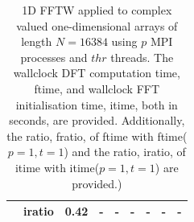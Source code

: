 \documentclass[a4paper]{article}
\begin{document}
\begin{table}[htbp]
\begin{center}
\begin{small}
\begin{tabular}{|r|r|r|r|r|r|r|r|r|}
     &  iratio &   0.42 &  - &  - &  - &  - &  - &  - \\ \hline
\end{tabular}
\caption{1D FFTW applied to complex valued one-dimensional arrays of length $N=16384$ using $p$ MPI processes and $thr$ threads. The wallclock DFT computation time, ftime, and wallclock FFT initialisation time, itime, both in seconds, are provided. Additionally, the ratio, fratio, of ftime  with ftime($p=1,t=1$) and the ratio, iratio, of itime  with itime($p=1,t=1$) are provided.) }\label{Tbl:FFT1d16384}
\end{small}
\end{center}
\end{table}
\end{document}
